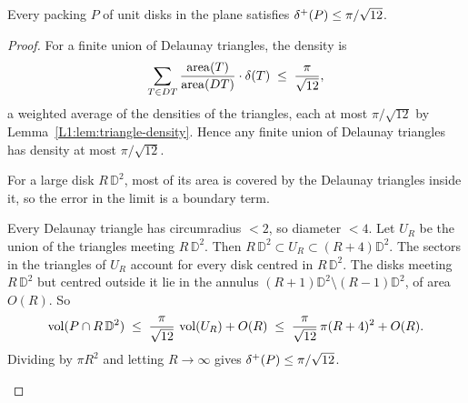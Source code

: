 \begin{theorem}
\label{L1:thm:thue}
Every packing $P$ of unit disks in the plane satisfies $\delta^+(P)\le\pi/\sqrt{12}$.
\end{theorem}

\begin{proof}
For a finite union of Delaunay triangles, the density is
\[
  \sum_{T\in DT}\frac{\operatorname{area}(T)}{\operatorname{area}(DT)}\cdot\delta(T)
  \;\le\;\frac{\pi}{\sqrt{12}},
\]
a weighted average of the densities of the triangles, each at most $\pi/\sqrt{12}$
by Lemma~\ref{L1:lem:triangle-density}. Hence any finite union of Delaunay triangles has density
at most $\pi/\sqrt{12}$.

For a large disk $R\,\mathbb{D}^2$, most of its area is covered by the Delaunay triangles inside it,
so the error in the limit is a boundary term.
\begin{addedblock}
Every Delaunay triangle has circumradius $<2$, so diameter $<4$. Let $U_R$ be the union of the
triangles meeting $R\,\mathbb{D}^2$. Then $R\,\mathbb{D}^2\subset U_R\subset(R+4)\mathbb{D}^2$. The sectors
in the triangles of $U_R$ account for every disk centred in $R\,\mathbb{D}^2$. The disks meeting
$R\,\mathbb{D}^2$ but centred outside it lie in the annulus $(R+1)\mathbb{D}^2\setminus(R-1)\mathbb{D}^2$, of area $O(R)$. So
\[
  \operatorname{vol}(P\cap R\,\mathbb{D}^2)\;\le\;\frac{\pi}{\sqrt{12}}\,\operatorname{vol}(U_R)+O(R)
  \;\le\;\frac{\pi}{\sqrt{12}}\,\pi(R+4)^2+O(R).
\]
Dividing by $\pi R^2$ and letting $R\to\infty$ gives $\delta^+(P)\le\pi/\sqrt{12}$.
\end{addedblock}
\end{proof}

\begin{remark}
\end{remark}
